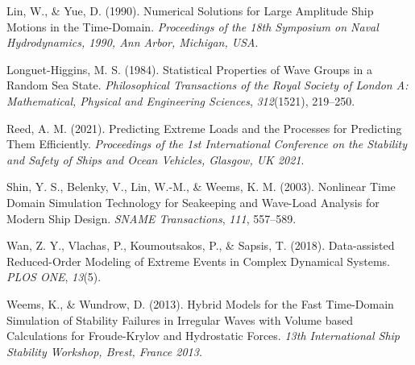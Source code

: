 \documentclass{article}
\begin{document}
\begin{thebibliography}{99}
 Lin, W., \& Yue, D. (1990). Numerical Solutions for Large Amplitude Ship Motions in the Time-Domain. \textit{Proceedings of the 18th Symposium on Naval Hydrodynamics, 1990, Ann Arbor, Michigan, USA}.

 Longuet-Higgins, M. S. (1984). Statistical Properties of Wave Groups in a Random Sea State. \textit{Philosophical Transactions of the Royal Society of London A: Mathematical, Physical and Engineering Sciences}, \textit{312}(1521), 219–250.

 Reed, A. M. (2021). Predicting Extreme Loads and the Processes for Predicting Them Efficiently. \textit{Proceedings of the 1st International Conference on the Stability and Safety of Ships and Ocean Vehicles, Glasgow, UK 2021}.

 Shin, Y. S., Belenky, V., Lin, W.-M., \& Weems, K. M. (2003). Nonlinear Time Domain Simulation Technology for Seakeeping and Wave-Load Analysis for Modern Ship Design. \textit{SNAME Transactions}, \textit{111}, 557–589.

 Wan, Z. Y., Vlachas, P., Koumoutsakos, P., \& Sapsis, T. (2018). Data-assisted Reduced-Order Modeling of Extreme Events in Complex Dynamical Systems. \textit{PLOS ONE}, \textit{13}(5).

 Weems, K., \& Wundrow, D. (2013). Hybrid Models for the Fast Time-Domain Simulation of Stability Failures in Irregular Waves with Volume based Calculations for Froude-Krylov and Hydrostatic Forces. \textit{13th International Ship Stability Workshop, Brest, France 2013}.
\end{thebibliography}
\end{document}
